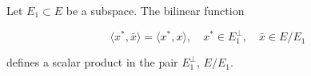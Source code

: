Let $E_1 \subset E$ be a subspace. The bilinear function

$$\langle x^*, \bar{x} \rangle = \langle x^*, x \rangle, \quad x^* \in E_1^\perp, \quad \bar{x} \in E/E_1$$

defines a scalar product in the pair $E_1^\perp$, $E/E_1$.
